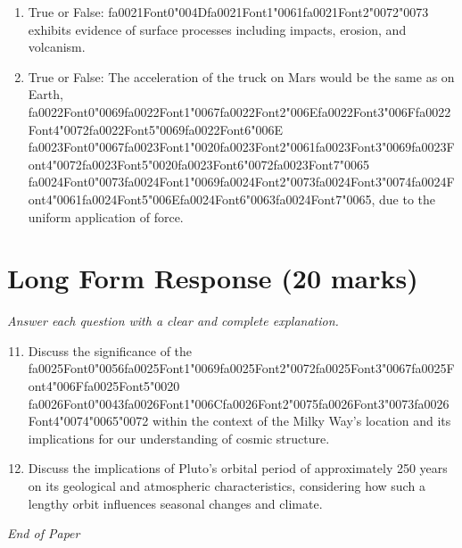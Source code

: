 \documentclass[12pt]{article}
\begin{document}
\begin{enumerate}[label=\arabic*.]
\item True or False: {\csname fa0021Font0\endcsname\char"004D}{\csname fa0021Font1\endcsname\char"0061}{\csname fa0021Font2\endcsname\char"0072}{\char"0073} exhibits evidence of surface processes including impacts, erosion, and volcanism.
\item True or False: The acceleration of the truck on Mars would be the same as on Earth, {\csname fa0022Font0\endcsname\char"0069}{\csname fa0022Font1\endcsname\char"0067}{\csname fa0022Font2\endcsname\char"006E}{\csname fa0022Font3\endcsname\char"006F}{\csname fa0022Font4\endcsname\char"0072}{\csname fa0022Font5\endcsname\char"0069}{\csname fa0022Font6\endcsname\char"006E} {\csname fa0023Font0\endcsname\char"0067}{\csname fa0023Font1\endcsname\char"0020}{\csname fa0023Font2\endcsname\char"0061}{\csname fa0023Font3\endcsname\char"0069}{\csname fa0023Font4\endcsname\char"0072}{\csname fa0023Font5\endcsname\char"0020}{\csname fa0023Font6\endcsname\char"0072}{\csname fa0023Font7\endcsname\char"0065} {\csname fa0024Font0\endcsname\char"0073}{\csname fa0024Font1\endcsname\char"0069}{\csname fa0024Font2\endcsname\char"0073}{\csname fa0024Font3\endcsname\char"0074}{\csname fa0024Font4\endcsname\char"0061}{\csname fa0024Font5\endcsname\char"006E}{\csname fa0024Font6\endcsname\char"0063}{\csname fa0024Font7\endcsname\char"0065}, due to the uniform application of force.
\end{enumerate}

\section*{Long Form Response (20 marks)}
\textit{Answer each question with a clear and complete explanation.}
\begin{enumerate}[label=\arabic*.]
\setcounter{enumi}{10}
\item Discuss the significance of the {\csname fa0025Font0\endcsname\char"0056}{\csname fa0025Font1\endcsname\char"0069}{\csname fa0025Font2\endcsname\char"0072}{\csname fa0025Font3\endcsname\char"0067}{\csname fa0025Font4\endcsname\char"006F}{\csname fa0025Font5\endcsname\char"0020} {\csname fa0026Font0\endcsname\char"0043}{\csname fa0026Font1\endcsname\char"006C}{\csname fa0026Font2\endcsname\char"0075}{\csname fa0026Font3\endcsname\char"0073}{\csname fa0026Font4\endcsname\char"0074}{\char"0065}{\char"0072} within the context of the Milky
Way's location and its implications for our understanding of cosmic structure.
\item Discuss the implications of Pluto's orbital period of approximately 250 years on its
geological and atmospheric characteristics, considering how such a lengthy orbit
influences seasonal changes and climate.
\end{enumerate}

\vfill
\noindent\textit{End of Paper}
\end{document}
